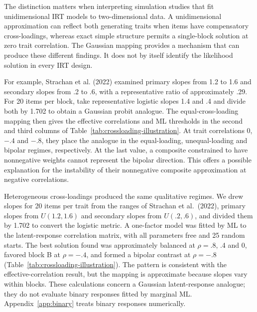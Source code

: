 The distinction matters when interpreting simulation studies that fit unidimensional IRT models to two-dimensional data. A unidimensional approximation can reflect both generating traits when items have compensatory cross-loadings, whereas exact simple structure permits a single-block solution at zero trait correlation. The Gaussian mapping provides a mechanism that can produce these different findings. It does not by itself identify the likelihood solution in every IRT design.

For example, Strachan et al. (2022) examined primary slopes from 1.2 to 1.6 and secondary slopes from .2 to .6, with a representative ratio of approximately .29. For 20 items per block, take representative logistic slopes 1.4 and .4 and divide both by 1.702 to obtain a Gaussian probit analogue. The equal-cross-loading mapping then gives the effective correlations and ML thresholds in the second and third columns of Table~\ref{tab:crossloading-illustration}. At trait correlations 0, $-.4$ and $-.8$, they place the analogue in the equal-loading, unequal-loading and bipolar regimes, respectively. At the last value, a composite constrained to have nonnegative weights cannot represent the bipolar direction. This offers a possible explanation for the instability of their nonnegative composite approximation at negative correlations.

\label{sec:crossloading-illustration}%
Heterogeneous cross-loadings produced the same qualitative regimes. We drew slopes for 20 items per trait from the ranges of Strachan et al.\ (2022), primary slopes from $U(1.2,1.6)$ and secondary slopes from $U(.2,.6)$, and divided them by 1.702 to convert the logistic metric. A one-factor model was fitted by ML to the latent-response correlation matrix, with all parameters free and 25 random starts. The best solution found was approximately balanced at $\rho=.8$, .4 and 0, favored block B at $\rho=-.4$, and formed a bipolar contrast at $\rho=-.8$ (Table~\ref{tab:crossloading-illustration}). The pattern is consistent with the effective-correlation result, but the mapping is approximate because slopes vary within blocks. These calculations concern a Gaussian latent-response analogue; they do not evaluate binary responses fitted by marginal ML. Appendix~\ref{app:binary} treats binary responses numerically.

